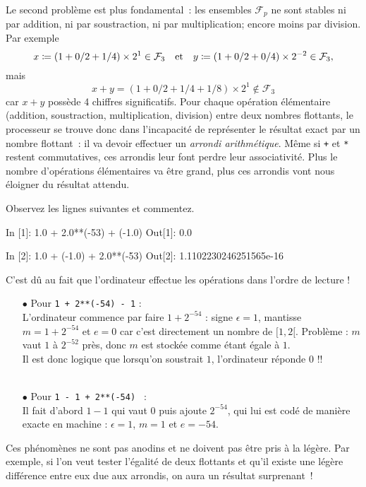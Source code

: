 \documentclass{magnolia}
\begin{document}
Le second problème est plus fondamental~: les ensembles $\mathcal{F}_p$ ne sont
stables ni par addition, ni par soustraction, ni par multiplication; encore moins par
division. Par exemple
\[x\coloneqq (1+0/2+1/4)\times 2^1 \in\mathcal{F}_3 \quad\text{et}\quad
  y\coloneqq (1+0/2+0/4)\times 2^{-2}\in\mathcal{F}_3,\]
mais
\[x+y=(1+0/2+1/4+1/8)\times 2^1\not\in\mathcal{F}_3\]
car $x+y$ possède 4 chiffres significatifs. Pour chaque opération élémentaire (addition,
soustraction, multiplication, division) entre deux nombres flottants, le processeur se
trouve donc dans l'incapacité de
représenter le résultat exact par un nombre flottant~: il va devoir effectuer
un \emph{arrondi arithmétique}.
 Même si \verb_+_ et \verb_*_ restent commutatives,
ces arrondis leur font perdre leur associativité.
Plus le nombre d'opérations élémentaires
va être grand, plus ces arrondis vont nous éloigner du résultat attendu.
\vspace{2ex}
\begin{exoUnique}
\exo Observez les lignes suivantes et commentez.
\begin{pythoncode}
In [1]: 1.0 + 2.0**(-53) + (-1.0)
Out[1]: 0.0

In [2]: 1.0 + (-1.0) + 2.0**(-53)
Out[2]: 1.1102230246251565e-16
\end{pythoncode}
\begin{sol}
C'est dû au fait que l'ordinateur effectue les opérations dans l'ordre de lecture !
\begin{itemize}
\item[$\bullet$] Pour \texttt{1 + 2**(-54) - 1} :\\ L'ordinateur  commence par faire $1 + 2^{-54}$ :
signe $\epsilon = 1$, mantisse $m=1+2^{-54}$ et 
$e=0$ car c'est directement un nombre de $[1,2[$.
Problème :  $m$ vaut $1$ à $2^{-52}$ près, donc $m$ est stockée comme étant égale à $1$. \\Il est donc logique que lorsqu'on soustrait $1$, l'ordinateur réponde $0$ !!\\
\\

\item[$\bullet$] Pour \texttt{1 - 1 + 2**(-54) } :\\
Il fait d'abord $1-1$ qui vaut $0$ puis ajoute $2^{-54}$, qui lui est codé de manière exacte en machine : $\epsilon = 1$,  $m=1$ et $e = -54$. 
\end{itemize}
\end{sol} 
\end{exoUnique}
\vspace{2ex}
Ces phénomènes ne sont pas anodins et ne doivent pas être pris à la légère. Par exemple, si l'on veut tester l'égalité de deux flottants et qu'il existe une légère différence entre
eux due aux arrondis, on aura un résultat surprenant~!
\end{document}
